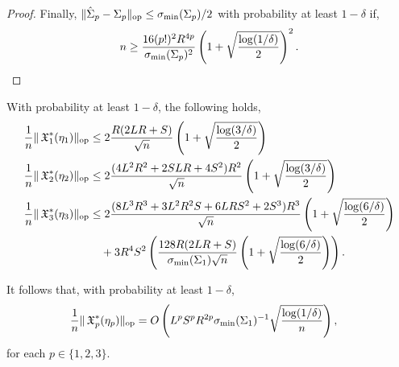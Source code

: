 \begin{proof}
Finally, $\|\hat\Sigma_p - \Sigma_p\|_{\text{\rm op}} \le \sigma_\text{\rm min}(\Sigma_p)/2$ with probability at least $1 - \delta$ if,
$$n \ge \frac{16 (p!)^2 R^{4p}}{\sigma_\text{\rm min}(\Sigma_p)^2} \left(1 + \sqrt{\frac{\log(1/\delta)}{2}}\right)^2.$$

\end{proof}

\begin{lemma}
\label{lem:lowRankUpper}
With probability at least $1-\delta$, the following holds,
\begin{align*}
  \frac{1}{n} \|\operatorname{\mathfrak{X}}_1^*(\eta_1)\|_{\text{\rm op}}
      &\le 2 \frac{R (2LR + S)}{\sqrt{n}} \left( 1 + \sqrt{\frac{\log(3/\delta)}{2}} \right) \\
  \frac{1}{n}  \|\operatorname{\mathfrak{X}}_2^*(\eta_2)\|_{\text{\rm op}} 
      &\le 2 \frac{(4L^2 R^2 + 2 S L R + 4S^2)R^2}{\sqrt{n}} \left( 1 + \sqrt{\frac{\log(3/\delta)}{2}} \right) \\
  \frac{1}{n} \|\operatorname{\mathfrak{X}}_3^*(\eta_3)\|_{\text{\rm op}} 
      &\le 2 \frac{(8L^3 R^3 + 3 L^2 R^2 S + 6 L R S^2 + 2S^3) R^3}{\sqrt{n}} \left( 1 + \sqrt{\frac{\log(6/\delta)}{2}} \right) \\
  &\quad + 3 R^4 S^2 \left(\frac{128R(2LR+S)}{\sigma_\text{\rm min}(\Sigma_1) \sqrt{n}} \left(1 + \sqrt{\frac{\log(6/\delta)}{2}} \right) \right).
\end{align*}
\end{lemma}

It follows that, with probability at least $1-\delta$,
\begin{align*}
  \frac{1}{n} \|\operatorname{\mathfrak{X}}_p^*(\eta_p)\|_{\text{\rm op}}
  &= O\left( L^p S^p R^{2p} \sigma_\text{\rm min}(\Sigma_1)^{-1} \sqrt{\frac{\log(1/\delta)}{n}} \right),
\end{align*}
for each $p \in \{1,2,3\}$.

